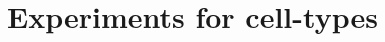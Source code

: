 \documentclass{article}
\theoremstyle{definition}
\begin{document}
                      


\section{Experiments for cell-types}
\label{sec:allen}

\begin{figure}
\end{figure}
\end{document}
